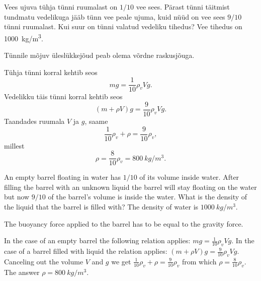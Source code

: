 
Vees ujuva tühja tünni ruumalast on $1/10$ vee sees. Pärast tünni täitmist
tundmatu vedelikuga jääb tünn vee peale ujuma, kuid nüüd on vee sees $9/10$ tünni
ruumalast. Kui suur on tünni valatud vedeliku tihedus? Vee tihedus on
\SI{1000}{kg/m^3}.

\hint
Tünnile mõjuv üleslükkejõud peab olema võrdne raskusjõuga.

\solu
Tühja tünni korral kehtib seos
\[
mg=\frac 1{10}\rho_vVg.
\]
Vedelikku täis tünni korral kehtib seos	
\[
(m+\rho V)g=\frac 9{10}\rho_vVg.
\]
Taandades ruumala $V$ ja $g$, saame
\[
\frac 1{10}\rho_v+\rho=\frac 9{10}\rho_v,
\]
millest 
\[
\rho=\frac 8{10}\rho_v = \SI{800}{kg/m^3}.
\]

An empty barrel floating in water has $1/10$ of its volume inside water. After filling the barrel with an unknown liquid the barrel will stay floating on the water but now $9/10$ of the barrel’s volume is inside the water. What is the density of the liquid that the barrel is filled with? The density of water is $\SI{1000}{kg/m^3}$.

\hinteng
The buoyancy force applied to the barrel has to be equal to the gravity force.

\solueng
In the case of an empty barrel the following relation applies: $mg=\frac 1{10}\rho_vVg$. In the case of a barrel filled with liquid the relation applies: $(m+\rho V)g=\frac 9{10}\rho_vVg$. Canceling out the volume $V$ and $g$ we get $\frac 1{10}\rho_v+\rho=\frac 9{10}\rho_v$ from which $\rho=\frac 8{10}\rho_v$. The answer $\rho= \SI{800}{kg/m^3}$.
\probend